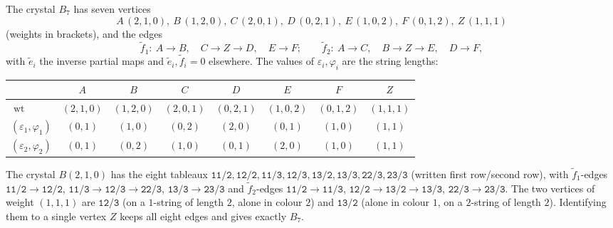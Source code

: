 \documentclass[11pt]{article}
\theoremstyle{definition}
\theoremstyle{remark}
\newcommand{\wt}{\operatorname{wt}}
\newcommand{\tb}[2]{\mathtt{#1/#2}}
\begin{document}
The crystal $B_7$ has seven vertices
\[
A\,(2,1,0),\ B\,(1,2,0),\ C\,(2,0,1),\ D\,(0,2,1),\ E\,(1,0,2),\ F\,(0,1,2),\ Z\,(1,1,1)
\]
(weights in brackets), and the edges
\[
\tilde f_1:\ A\to B,\quad C\to Z\to D,\quad E\to F;\qquad
\tilde f_2:\ A\to C,\quad B\to Z\to E,\quad D\to F,
\]
with $\tilde e_i$ the inverse partial maps and $\tilde e_i,\tilde f_i=0$ elsewhere. The values of
$\varepsilon_i,\varphi_i$ are the string lengths:
\begin{center}
\begin{tabular}{lccccccc}
\toprule
 & $A$ & $B$ & $C$ & $D$ & $E$ & $F$ & $Z$\\
\midrule
$\wt$ & $(2,1,0)$ & $(1,2,0)$ & $(2,0,1)$ & $(0,2,1)$ & $(1,0,2)$ & $(0,1,2)$ & $(1,1,1)$\\
$(\varepsilon_1,\varphi_1)$ & $(0,1)$ & $(1,0)$ & $(0,2)$ & $(2,0)$ & $(0,1)$ & $(1,0)$ & $(1,1)$\\
$(\varepsilon_2,\varphi_2)$ & $(0,1)$ & $(0,2)$ & $(1,0)$ & $(0,1)$ & $(2,0)$ & $(1,0)$ & $(1,1)$\\
\bottomrule
\end{tabular}
\end{center}
The crystal $B(2,1,0)$ has the eight tableaux
$\tb{11}{2},\tb{12}{2},\tb{11}{3},\tb{12}{3},\tb{13}{2},\tb{13}{3},
\tb{22}{3},\tb{23}{3}$ (written first row/second row), with
$\tilde f_1$-edges $\tb{11}{2}\to\tb{12}{2}$, $\tb{11}{3}\to\tb{12}{3}\to\tb{22}{3}$,
$\tb{13}{3}\to\tb{23}{3}$ and $\tilde f_2$-edges $\tb{11}{2}\to\tb{11}{3}$,
$\tb{12}{2}\to\tb{13}{2}\to\tb{13}{3}$, $\tb{22}{3}\to\tb{23}{3}$. The two
vertices of weight $(1,1,1)$ are $\tb{12}{3}$ (on a $1$-string of length $2$, alone in
colour $2$) and $\tb{13}{2}$ (alone in colour $1$, on a $2$-string of length $2$).
Identifying them to a single vertex $Z$ keeps all eight edges and gives exactly $B_7$.
\end{document}
